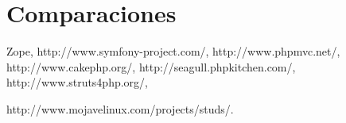 \section{Comparaciones}
Zope, http://www.symfony-project.com/,
http://www.phpmvc.net/, http://www.cakephp.org/,
http://seagull.phpkitchen.com/, http://www.struts4php.org/,

http://www.mojavelinux.com/projects/studs/.